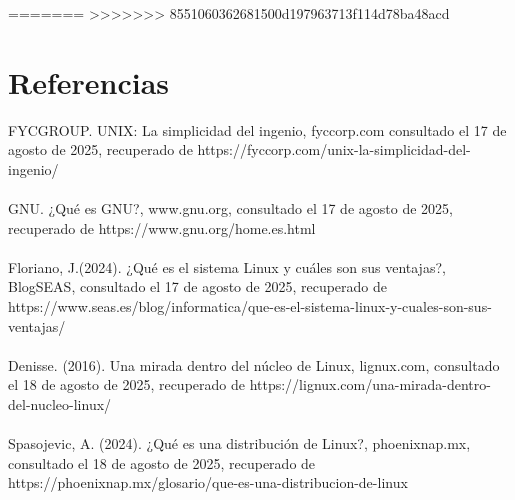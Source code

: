 \documentclass[10pt,a4paper,titlepage]{article}
\begin{document}
=======
>>>>>>> 8551060362681500d197963713f114d78ba48acd
	\section*{Referencias}
	FYCGROUP. UNIX: La simplicidad del ingenio, fyccorp.com consultado el 17 de agosto de 2025, recuperado de https://fyccorp.com/unix-la-simplicidad-del-ingenio/	
	\\
	\\
	GNU. ¿Qué es GNU?, www.gnu.org, consultado el 17 de agosto de 2025, recuperado de https://www.gnu.org/home.es.html
	\\
	\\
	Floriano, J.(2024). ¿Qué es el sistema Linux y cuáles son sus ventajas?, BlogSEAS, consultado el 17 de agosto de 2025, recuperado de https://www.seas.es/blog/informatica/que-es-el-sistema-linux-y-cuales-son-sus-ventajas/
	\\
	\\
	Denisse. (2016). Una mirada dentro del núcleo de Linux, lignux.com, consultado el 18 de agosto de 2025, recuperado de https://lignux.com/una-mirada-dentro-del-nucleo-linux/
	\\
	\\
	Spasojevic, A. (2024). ¿Qué es una distribución de Linux?, phoenixnap.mx, consultado el 18 de agosto de 2025, recuperado de https://phoenixnap.mx/glosario/que-es-una-distribucion-de-linux
	
\end{document}
